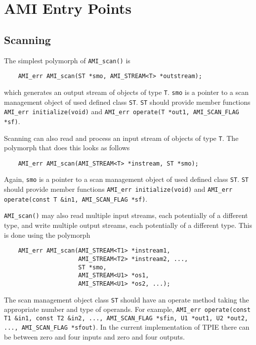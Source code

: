 \section{AMI Entry Points}


\subsection{Scanning}
\label{sec:ref-ami-scan}

The simplest polymorph of \verb|AMI_scan()| is
\begin{verbatim}
    AMI_err AMI_scan(ST *smo, AMI_STREAM<T> *outstream);
\end{verbatim}
which generates an output stream of objects of type \verb|T|.
\verb|smo| is a pointer to a scan management object of used defined
class \verb|ST|.  \verb|ST| should provide member functions {\tt
  AMI\_err initialize(void)} and {\tt AMI\_err operate(T *out1,
  AMI\_SCAN\_FLAG *sf)}.

Scanning can also read and process an input stream of objects of type
\verb|T|.  The polymorph that does this looks as follows
\begin{verbatim}
    AMI_err AMI_scan(AMI_STREAM<T> *instream, ST *smo);
\end{verbatim}
Again, \verb|smo| is a pointer to a scan management object of used
defined class \verb|ST|.  \verb|ST| should provide member functions
{\tt AMI\_err initialize(void)} and {\tt AMI\_err operate(const T
  \&in1, AMI\_SCAN\_FLAG *sf)}.

\verb|AMI_scan()| may also read multiple input streams, each
potentially of a different type, and write multiple output streams,
each potentially of a different type.  This is done using the polymorph
\begin{verbatim}
    AMI_err AMI_scan(AMI_STREAM<T1> *instream1, 
                     AMI_STREAM<T2> *instream2, ..., 
                     ST *smo, 
                     AMI_STREAM<U1> *os1, 
                     AMI_STREAM<U1> *os2, ...);
\end{verbatim}
The scan management object class \verb|ST| should have an operate
method taking the appropriate number and type of operands.  For
example, {\tt AMI\_err operate(const T1 \&in1, const T2 \&in2, ...,
  AMI\_SCAN\_FLAG *sfin, U1 *out1, U2 *out2, ..., AMI\_SCAN\_FLAG
  *sfout)}.  In the current implementation of TPIE there can be
between zero and four inputs and zero and four outputs.


